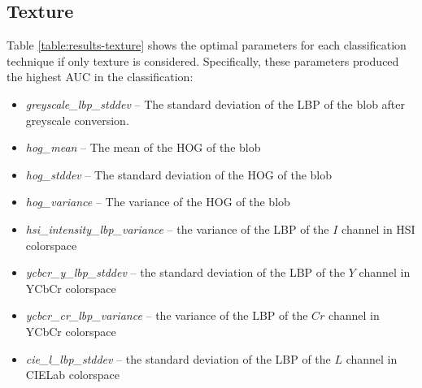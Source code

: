 \documentclass[letterpaper]{article}
\begin{document}
{\subsection{Texture}
Table \ref{table:results-texture} shows the optimal parameters for each classification technique if only texture is considered. Specifically, these parameters produced the highest AUC in the classification:
\begin{itemize}
	\item{\textit{greyscale\_lbp\_stddev} -- The standard deviation of the LBP of the blob after greyscale conversion.}
	\item{\textit{hog\_mean} -- The mean of the HOG of the blob}
	\item{\textit{hog\_stddev} -- The standard deviation of the HOG of the blob}
	\item{\textit{hog\_variance} -- The variance of the HOG of the blob}
	\item{\textit{hsi\_intensity\_lbp\_variance} -- the variance of the LBP of the $I$ channel in HSI colorspace}
	\item{\textit{ycbcr\_y\_lbp\_stddev} -- the standard deviation of the LBP of the $Y$ channel in YCbCr colorspace}
	\item{\textit{ycbcr\_cr\_lbp\_variance} -- the variance of the LBP of the $Cr$ channel in YCbCr colorspace}	
	\item{\textit{cie\_l\_lbp\_stddev} -- the standard deviation of the LBP of the $L$ channel in CIELab colorspace}
\end{itemize}


\begin{tiny}
\renewcommand{\arraystretch}{1.2}




\end{tiny}

}
\end{document}
